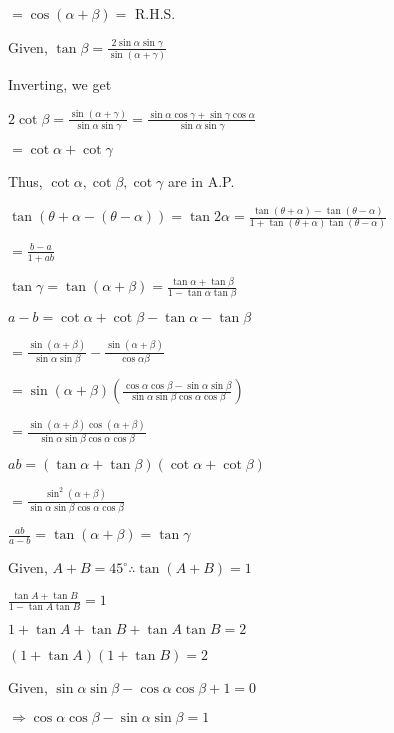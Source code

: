   $= \cos(\alpha + \beta) =$ R.H.S.

\item Given, $\tan \beta = \frac{2\sin\alpha\sin\gamma}{\sin(\alpha + \gamma)}$

  Inverting, we get

  $2\cot\beta = \frac{\sin(\alpha + \gamma)}{\sin\alpha\sin\gamma} = \frac{\sin\alpha\cos\gamma +
    \sin\gamma\cos\alpha}{\sin\alpha\sin\gamma}$

  $= \cot \alpha + \cot \gamma$

  Thus, $\cot\alpha, \cot\beta, \cot\gamma$ are in A.P.

\item $\tan(\theta + \alpha - (\theta - \alpha)) = \tan2\alpha = \frac{\tan(\theta + \alpha) - \tan(\theta - \alpha)}{1 +
  \tan(\theta + \alpha)\tan(\theta - \alpha)}$

  $= \frac{b - a}{1 + ab}$

\item $\tan\gamma = \tan(\alpha + \beta) = \frac{\tan\alpha + \tan\beta}{1 - \tan\alpha\tan\beta}$

  $a - b = \cot\alpha + \cot\beta - \tan\alpha - \tan\beta$

  $= \frac{\sin(\alpha + \beta)}{\sin\alpha\sin\beta} - \frac{\sin(\alpha + \beta)}{\cos\alpha\beta}$

  $= \sin(\alpha + \beta)\left(\frac{\cos\alpha\cos\beta -
  \sin\alpha\sin\beta}{\sin\alpha\sin\beta\cos\alpha\cos\beta}\right)$

  $= \frac{\sin(\alpha + \beta)\cos(\alpha + \beta)}{\sin\alpha\sin\beta\cos\alpha\cos\beta}$

  $ab = (\tan\alpha + \tan\beta)(\cot\alpha + \cot\beta)$

  $= \frac{\sin^2(\alpha + \beta)}{\sin\alpha\sin\beta\cos\alpha\cos\beta}$

  $\frac{ab}{a - b} = \tan(\alpha + \beta) = \tan\gamma$

\item Given, $A + B = 45^\circ \therefore \tan(A + B) = 1$

  $\frac{\tan A + \tan B}{1 - \tan A\tan B} = 1$

  $1 + \tan A + \tan B + \tan A \tan B = 2$

  $(1 + \tan A)(1 + \tan B) = 2$

\item Given, $\sin\alpha\sin\beta - \cos\alpha\cos\beta + 1 = 0$

  $\Rightarrow \cos\alpha\cos\beta - \sin\alpha\sin\beta = 1$

